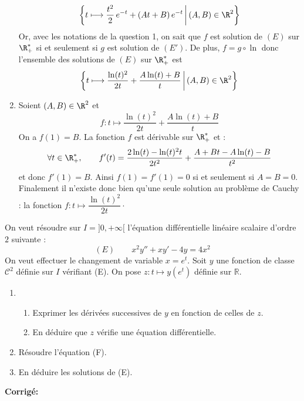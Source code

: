 \documentclass[a4paper,twoside,french,11pt]{VcCours}
\newcommand{\corr}{\textbf{Corrigé:}}
\begin{document}
\begin{enumerate}
$$
\bigg\{t \longmapsto \dfrac{t^2}{2}\,e^{-t}+(At+B)\,e^{-t}\,\bigg|\,(A,B)\in \R^2\bigg\}
$$
Or, avec les notations de la question 1, on sait que $f$ est solution de $(E)$ sur $\R_+^*$ si et seulement si $g$ est solution de $(E')$. De plus, $f=g\circ \ln$ donc l'ensemble des solutions de $(E)$ sur $\R_+^*$ est 
$$\bigg\{t \longmapsto \frac{\ln(t)^2}{2t}+\frac{A\ln(t)+B}{t}\,\bigg|\,(A,B)\in \R^2\bigg\}$$
\item Soient $(A,B)\in \R^2$ et 
$$f : t \longmapsto \dfrac{\ln(t)^2}{2t}+\dfrac{A\ln(t)+B}{t}$$
 On a $f(1)=B$. La fonction $f$ est dérivable sur $\R_+^*$ et :
$$
\forall t\in \R_+^*,\qquad f'(t)=\frac{2\ln(t)-\ln(t)^2t}{2t^2}+\frac{A+Bt-A\ln(t)-B}{t^2}
$$
et donc $f'(1)=B$. Ainsi $f(1)=f'(1)=0$ si et seulement si $A=B=0$. Finalement il n'existe donc bien qu'une seule solution au problème de Cauchy : la fonction $f : t \longmapsto \dfrac{\ln(t)^2}{2t} \cdot$
\end{enumerate}

\begin{Exercice}{} On veut résoudre sur $I=]0,+\infty[$ l'équation  différentielle linéaire scalaire d'ordre $2$ suivante :
$$ (E) \qquad x^2y''+xy' -4y = 4x^2$$
On veut effectuer le changement de variable $x=e^t$. Soit $y$ une fonction de classe $\mathcal C^2$ définie sur $I$ vérifiant (E). On pose $z : t \mapsto y(e^t)$ définie sur $\mathbb R$. 

\begin{enumerate}
\item
\begin{enumerate}
\item Exprimer les dérivées successives de $y$ en fonction de celles de $z$.
\item En déduire que $z$ vérifie une équation différentielle.
\end{enumerate}
\item Résoudre l'équation (F).
\item En déduire les solutions de (E).
\end{enumerate}
\end{Exercice}

\corr
\end{document}
